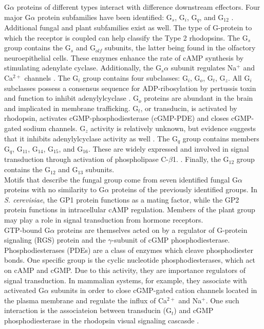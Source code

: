 \indent G$\alpha$ proteins of different types interact with difference downstream effectors. Four major G$\alpha$ protein subfamilies have been identified: G$_{s}$, G$_{i}$, G$_{q}$, and G$_{12}$ \cite{Hepler1992}. Additional fungal \cite{Bolker1998} and plant \cite{Ma1994} subfamilies exist as well. The type of G-protein to which the receptor is coupled can help classify the Type 2 rhodopsins. The G$_{s}$ group contains the G$_{s}$ and G$_{olf}$  subunits, the latter being found in the olfactory neuroepithelial cells. These enzymes enhance the rate of cAMP synthesis by stimulating adenylate cyclase. Additionally, the G$_{s}\alpha$ subunit regulates Na$^{+}$ and Ca$^{2+}$ channels \cite{Hepler1992}. The G$_{i}$ group contains four subclasses: G$_{i}$, G$_{o}$, G$_{t}$, G$_{z}$. All G$_{i}$ subclasses possess a consensus sequence for ADP-ribosylation by pertussis toxin and function to inhibit adenylylcyclase \cite{KABMycotaIII}. G$_{o}$ proteins are abundant in the brain and implicated in membrane trafficking. G$_{t}$, or transducin, is activated by rhodopsin, activates cGMP-phosphodiesterase (cGMP-PDE) and closes cGMP-gated sodium channels. G$_{z}$ activity is relatively unknown, but evidence suggests that it inhibits adenylylcyclase activity as well \cite{KABMycotaIII}. The G$_{q}$ group contains members G$_{q}$, G$_{11}$, G$_{14}$, G$_{15}$, and G$_{16}$. These are widely expressed and involved in signal transduction through activation of phospholipase C-$\beta$1. \cite{KABMycotaIII}. Finally, the G$_{12}$ group contains the G$_{12}$ and G$_{13}$ subunits.\\
\indent Motifs that describe the fungal group come from seven identified fungal G$\alpha$ proteins with no similarity to G$\alpha$ proteins of the previously identified groups. In \textit{S. cerevisiae}, the GP1 protein functions as a mating factor, while the GP2 protein functions in intracellular cAMP regulation. Members of the plant group may play a role in signal transduction from hormone receptors.\\
\indent GTP-bound G$\alpha$ proteins are themselves acted on by a regulator of G-protein signaling (RGS) protein and the $\gamma$-subunit of cGMP phosphodiesterase.\\
\indent Phosphodiesterases (PDEs) are a class of enzymes which cleave phosphodiester bonds. One specific group is the cyclic nucleotide phosphodiesterases, which act on cAMP and cGMP. Due to this activity, they are importance regulators of signal transduction. In mammalian systems, for example, they associate with activeated G$\alpha$ subunits in order to close cGMP-gated cation channels located in the plasma membrane and regulate the influx of Ca$^{2+}$ and Na$^{+}$. One such interaction is the associateion between transducin (G$_{t}$) and cGMP phosphodiesterase in the rhodopsin visual signaling cascasde \cite{}.\\
